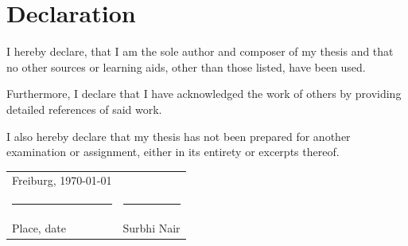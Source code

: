 \begingroup
\setlength{\parindent}{0pt}

\section*{Declaration}

\bigskip
\bigskip
\bigskip

I hereby declare, that I am the sole author and composer of my thesis and
that no other sources or learning aids, other than those listed, have been used.

Furthermore, I declare that I have acknowledged the work of others
by providing detailed references of said work.

I also hereby declare that my thesis has not been prepared
for another examination or assignment, either in its entirety or excerpts thereof.

\bigskip
\bigskip
\bigskip
\bigskip
\bigskip
\bigskip

\begin{tabular}{p{} l}
    Freiburg, \today             &                              \\
    \rule{\textwidth*2/5}{0.4pt} & \rule{\textwidth*2/5}{0.4pt} \\
    Place, date                  & Surbhi Nair
\end{tabular}

\endgroup
